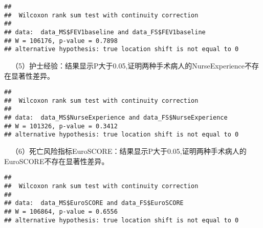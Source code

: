 \documentclass[
]{article}
\newenvironment{Shaded}{\begin{snugshade}}{\end{snugshade}}
\newcommand{\FunctionTok}[1]{\textcolor[rgb]{0.00,0.00,0.00}{#1}}
\newcommand{\NormalTok}[1]{#1}
\newcommand{\SpecialCharTok}[1]{\textcolor[rgb]{0.00,0.00,0.00}{#1}}
\begin{document}
\begin{Shaded}
\end{Shaded}

\begin{verbatim}
## 
##  Wilcoxon rank sum test with continuity correction
## 
## data:  data_MS$FEV1baseline and data_FS$FEV1baseline
## W = 106176, p-value = 0.7898
## alternative hypothesis: true location shift is not equal to 0
\end{verbatim}

 （5）护士经验：结果显示P大于0.05,证明两种手术病人的NurseExperience不存在显著性差异。

\begin{Shaded}
\end{Shaded}

\begin{verbatim}
## 
##  Wilcoxon rank sum test with continuity correction
## 
## data:  data_MS$NurseExperience and data_FS$NurseExperience
## W = 101326, p-value = 0.3412
## alternative hypothesis: true location shift is not equal to 0
\end{verbatim}

 （6）死亡风险指标EuroSCORE：结果显示P大于0.05,证明两种手术病人的EuroSCORE不存在显著性差异。

\begin{Shaded}
\end{Shaded}

\begin{verbatim}
## 
##  Wilcoxon rank sum test with continuity correction
## 
## data:  data_MS$EuroSCORE and data_FS$EuroSCORE
## W = 106864, p-value = 0.6556
## alternative hypothesis: true location shift is not equal to 0
\end{verbatim}
\end{document}
